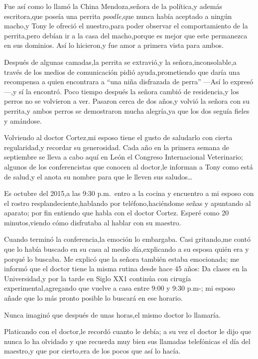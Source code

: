 \documentclass[letterpaper,12pt]{book}
\begin{document}
Fue así como lo llamó la China Mendoza,señora de la política,y además escritora,que poseía una perrita {\it poodle},que nunca había aceptado a ningún macho,y Tony le ofreció el nuestro,para poder observar el comportamiento de la perrita,pero debían ir a la casa del macho,porque es mejor que este permanezca en sus dominios. Así lo hicieron,y fue amor a primera vista para ambos.

Después de algunas camadas,la perrita se extravió,y la señora,inconsolable,a través de los medios de comunicación pidió ayuda,prometiendo que daría una recompensa a quien encontrara a ``una niña disfrazada de perra'' ---Así lo expresó---,y sí la encontró. Poco tiempo después la señora cambió de residencia,y los perros no se volvieron a ver. Pasaron cerca de dos años,y volvió la señora con su perrita,y ambos perros se demostraron mucha alegría,ya que los dos seguía fieles y amándose.

Volviendo al doctor Cortez,mi esposo tiene el gusto de saludarlo con cierta regularidad,y recordar su generosidad. Cada año en la primera semana de septiembre se lleva a cabo aquí en León el Congreso Internacional Veterinario; algunos de los conferencistas que conocen al doctor,le informan a Tony como está de salud,y el anota su nombre para que le lleven sus saludos\ldots

Es octubre del 2015,a las 9:30 p.m.\ entro a la cocina y encuentro a mi esposo con el rostro resplandeciente,hablando por teléfono,haciéndome señas y apuntando al aparato; por fin entiendo que habla con el doctor Cortez. Esperé como 20 minutos,viendo cómo disfrutaba al hablar con su maestro.

Cuando terminó la conferencia,la emoción lo embargaba. Casi gritando,me contó que lo había buscado en su casa al medio día,explicando a su esposa quién era y porqué lo buscaba. Me explicó que la señora también estaba emocionada; me informó que el doctor tiene la misma rutina desde hace 45 años: Da clases en la Universidad,y por la tarde en Siglo XX1 continúa con cirugía experimental,agregando que vuelve a casa entre 9:00 y 9:30 p.m-; mi esposo añade que lo más pronto posible lo buscará en ese horario.

Nunca imaginó que después de unas horas,el mismo doctor lo llamaría.

Platicando con el doctor,le recordó cuanto le debía; a su vez el doctor le dijo que nunca lo ha olvidado y que recuerda muy bien sus llamadas telefónicas el día del maestro,y que por cierto,era de los pocos que así lo hacía.
\end{document}
